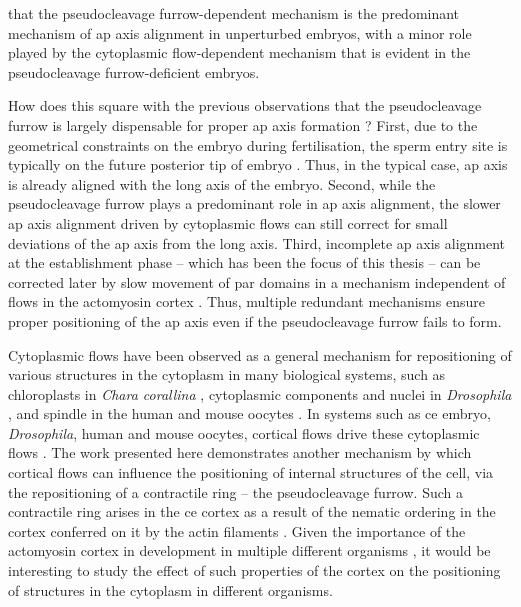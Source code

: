 that the pseudocleavage furrow-dependent mechanism is the predominant mechanism of \ac{ap} axis alignment in unperturbed embryos, with a minor role played by the cytoplasmic flow-dependent mechanism that is evident in the pseudocleavage furrow-deficient embryos.

How does this square with the previous observations that the pseudocleavage furrow is largely dispensable for proper \ac{ap} axis formation \citep{rose1995pseudocleavage, cowan2004asymmetric}? First, due to the geometrical constraints on the embryo during fertilisation, the sperm entry site is typically on the future posterior tip of embryo \citep{goldstein1996specification}. Thus, in the typical case, \ac{ap} axis is already aligned with the long axis of the embryo. Second, while the pseudocleavage furrow plays a predominant role in \ac{ap} axis alignment, the slower \ac{ap} axis alignment driven by cytoplasmic flows can still correct for small deviations of the \ac{ap} axis from the long axis. Third, incomplete \ac{ap} axis alignment at the establishment phase -- which has been the focus of this thesis -- can be corrected later by slow movement of \ac{par} domains in a mechanism independent of flows in the actomyosin cortex \citep{mittasch2018non,gessele2020geometric}. Thus, multiple redundant mechanisms ensure proper positioning of the \ac{ap} axis even if the pseudocleavage furrow fails to form.

Cytoplasmic flows have been observed as a general mechanism for repositioning of various structures in the cytoplasm in many biological systems, such as chloroplasts in \emph{Chara corallina} \citep{goldstein2015physical}, cytoplasmic components and nuclei in \emph{Drosophila} \citep{quinlan2016cytoplasmic,deneke2019self}, and spindle in the human and mouse oocytes \citep{yi2011dynamic,wang2020symmetry}. In systems such as \ac{ce} embryo, \emph{Drosophila}, human and mouse oocytes, cortical flows drive these cytoplasmic flows \citep{niwayama2011hydrodynamic,yi2011dynamic,deneke2019self,wang2020symmetry}. The work presented here demonstrates another mechanism by which cortical flows can influence the positioning of internal structures of the cell, via the repositioning of a contractile ring -- the pseudocleavage furrow. Such a contractile ring arises in the \ac{ce} cortex as a result of the nematic ordering in the cortex conferred on it by the actin filaments \citep{reymann2016cortical}. Given the importance of the actomyosin cortex in development in multiple different organisms \citep{gross2017active}, it would be interesting to study the effect of such properties of the cortex on the positioning of structures in the cytoplasm in different organisms.

